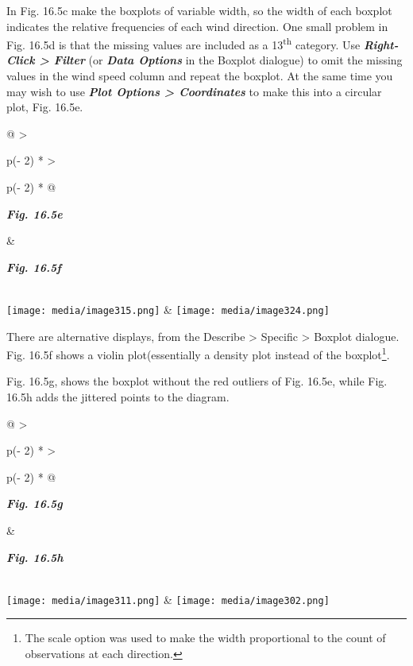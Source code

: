 \documentclass[
  letterpaper,
  DIV=11,
  numbers=noendperiod]{scrreprt}
\begin{document}
In Fig. 16.5c make the boxplots of variable width, so the width of each
boxplot indicates the relative frequencies of each wind direction. One
small problem in Fig. 16.5d is that the missing values are included as a
13\textsuperscript{th} category. Use \textbf{\emph{Right-Click
\textgreater{} Filter}} (or \textbf{\emph{Data Options}} in the Boxplot
dialogue) to omit the missing values in the wind speed column and repeat
the boxplot. At the same time you may wish to use \textbf{\emph{Plot
Options \textgreater{} Coordinates}} to make this into a circular plot,
Fig. 16.5e.

\begin{longtable}[]{@{}
  >{\raggedright\arraybackslash}p{(\columnwidth - 2\tabcolsep) * }
  >{\raggedright\arraybackslash}p{(\columnwidth - 2\tabcolsep) * }@{}}
\toprule\noalign{}
\begin{minipage}[b]{\linewidth}\raggedright
\textbf{\emph{Fig. 16.5e}}
\end{minipage} & \begin{minipage}[b]{\linewidth}\raggedright
\textbf{\emph{Fig. 16.5f}}
\end{minipage} \\
\midrule\noalign{}
\endhead
\bottomrule\noalign{}
\endlastfoot
\texttt{[image: media/image315.png]} &
\texttt{[image: media/image324.png]} \\
\end{longtable}

There are alternative displays, from the Describe \textgreater{}
Specific \textgreater{} Boxplot dialogue. Fig. 16.5f shows a violin
plot(essentially a density plot instead of the boxplot\footnote{The
  scale option was used to make the width proportional to the count of
  observations at each direction.}.

Fig. 16.5g, shows the boxplot without the red outliers of Fig. 16.5e,
while Fig. 16.5h adds the jittered points to the diagram.

\begin{longtable}[]{@{}
  >{\raggedright\arraybackslash}p{(\columnwidth - 2\tabcolsep) * }
  >{\raggedright\arraybackslash}p{(\columnwidth - 2\tabcolsep) * }@{}}
\toprule\noalign{}
\begin{minipage}[b]{\linewidth}\raggedright
\textbf{\emph{Fig. 16.5g}}
\end{minipage} & \begin{minipage}[b]{\linewidth}\raggedright
\textbf{\emph{Fig. 16.5h}}
\end{minipage} \\
\midrule\noalign{}
\endhead
\bottomrule\noalign{}
\endlastfoot
\texttt{[image: media/image311.png]} &
\texttt{[image: media/image302.png]} \\
\end{longtable}
\end{document}
